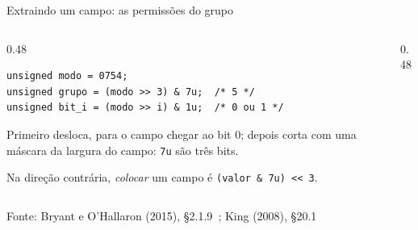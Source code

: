 \documentclass[aspectratio=169]{beamer}
\newcommand{\bits}[3]{%
  \foreach \b [count=\k from 0] in {#3} {
    \node[bit\b] at (#1+0.42*\k, #2) {\b};
  }
}
\newcommand{\fonte}[1]{\vfill\hfill{\scriptsize\textcolor{UFSGray}{Fonte: #1}}}
\begin{document}
\begin{frame}[fragile]{Extraindo um campo: as permissões do grupo}
  \begin{columns}[c]
    \begin{column}{0.48\textwidth}
\begin{lstlisting}[style=codC]
unsigned modo = 0754;
unsigned grupo = (modo >> 3) & 7u;  /* 5 */
unsigned bit_i = (modo >> i) & 1u;  /* 0 ou 1 */
\end{lstlisting}
      \small Primeiro desloca, para o campo chegar ao bit 0; depois corta
      com uma máscara da largura do campo: \texttt{7u} são três bits.

      \medskip
      Na direção contrária, \emph{colocar} um campo é
      \texttt{(valor \& 7u) <{}< 3}.
    \end{column}
    \begin{column}{0.48\textwidth}
      \begin{center}
      \end{center}
    \end{column}
  \end{columns}
  \fonte{Bryant e O'Hallaron (2015), §2.1.9~\cite{bryant2015computer};
    King (2008), §20.1~\cite{king2008c}}
\end{frame}
\end{document}
